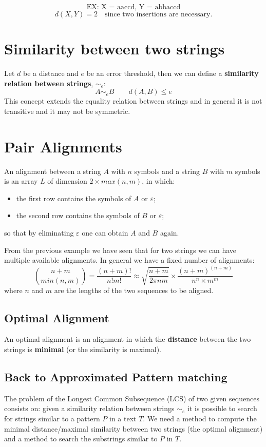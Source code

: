 $$\text{EX: X = aaccd, Y = abbaccd}$$
$$d(X,Y) = 2 \quad \text{since two insertions are necessary.}$$

\section{Similarity between two strings}
Let $d$ be a distance and $e$ be an error threshold, then we can define a \textbf{similarity relation between strings}, $\sim_e$:
$$A\sim_eB \qquad d(A,B)\leq e$$
This concept extends the equality relation between strings and in general it is not transitive and it may not be symmetric.


\section{Pair Alignments}
An alignment between a string $A$ with $n$ symbols and a string $B$ with $m$ symbols is an array $L$ of dimension $2\times max(n,m)$, in which:
\begin{itemize}
	\item the first row contains the symbols of $A$ or $\varepsilon$;
	\item the second row contains the symbols of $B$ or $\varepsilon$;
\end{itemize}
so that by eliminating $\varepsilon$ one can obtain $A$ and $B$ again. 

From the previous example we have seen that for two strings we can have multiple available alignments. In general we have a fixed number of alignments:
$$\binom{n+m}{min(n,m)} = \frac{(n+m)!}{n!m!}\approx \sqrt{\frac{n+m}{2\pi nm}}\times \frac{(n+m)^{(n+m)}}{n^n\times m^m}$$
where $n$ and $m$ are the lengths of the two sequences to be aligned.

\subsection{Optimal Alignment}
An optimal alignment is an alignment in which the \textbf{distance} between the two strings is \textbf{minimal} (or the similarity is maximal).

\subsection{Back to Approximated Pattern matching}
The problem of the Longest Common Subsequence (LCS) of two given sequences consists on: given a similarity relation between strings $\sim_e$ it is possible to search for strings similar to a pattern $P$ in a text $T$. We need a method to compute the minimal distance/maximal similarity between two strings (the optimal alignment) and a method to search the substrings similar to $P$ in $T$.


